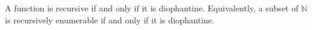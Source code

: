 A function is recursive if and only if it is diophantine. Equivalently, a subset of $\mathbb{N}$ is recursively enumerable if and only if it is diophantine.
